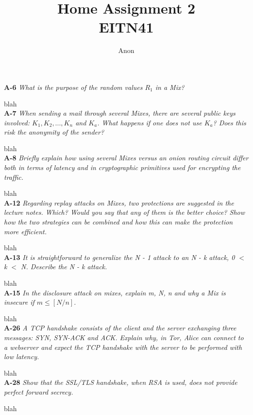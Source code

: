 \documentclass[a4paper]{article}
\title{Home Assignment 2 \\ EITN41}
\author{Anon}
\date{}
\newcommand{\Q}[2]{
  \textbf{#1} \textit{#2}
 }
\newcommand{\A}[1]{ #1 \\ }
\begin{document}
\maketitle

\Q{A-6} {
  What is the purpose of the random values $R_1$ in a Mix?
}

\A{
  blah
}

\Q{A-7} {
  When sending a mail through several Mixes, there are several public keys 
  involved: $K_1,K_2, . . . ,K_n$ and $K_a$. 
  What happens if one does not use $K_a$? 
  Does this risk the anonymity of the sender?
}

\A{
  blah
}

\Q{A-8} {
 Briefly explain how using several Mixes versus an onion routing 
 circuit differ both in terms of latency and in cryptographic 
 primitives used for encrypting the traffic. 
}

\A{
  blah
}

\Q{A-12} {
  Regarding replay attacks on Mixes, two protections are suggested in the lecture notes. 
  Which? Would you say that any of them is the better choice?
  Show how the two strategies can be combined and how this
  can make the protection more efficient.
}

\A{
  blah
}

\Q{A-13} {
  It is straightforward to generalize the N - 1 attack to an 
  N - k attack, 0 $<$ k $<$ N. Describe the N - k attack.
}

\A{
  blah
}

\Q{A-15} {
  In the disclosure attack on mixes, 
  explain m, N, n and why a Mix is insecure if $m \leq [N / n]$.
}

\A{
  blah
}

\Q{A-26} {
  A TCP handshake consists of the client and the server exchanging 
  three messages: SYN, SYN-ACK and ACK. 
  Explain why, in Tor, Alice can connect to a webserver and expect 
  the TCP handshake with the
  server to be performed with low latency.
}

\A{
  blah
}

\Q{A-28} {
  Show that the SSL/TLS handshake, when RSA is used, 
  does not provide perfect forward secrecy.
}

\A{
  blah
}


\end{document}
